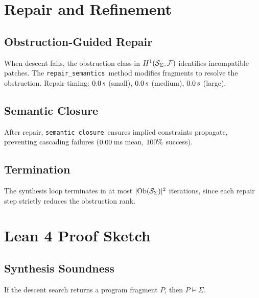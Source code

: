 \documentclass[11pt]{article}
\newcommand{\FragmentSpace}{\mathcal{F}}
\newcommand{\SpecSpace}{\mathcal{S}_\Sigma}
\newcommand{\RepairSem}{\texttt{repair\_semantics}}
\newcommand{\SemClosure}{\texttt{semantic\_closure}}
\begin{document}
\section{Repair and Refinement}\label{sec:repair}

\subsection{Obstruction-Guided Repair}
When descent fails, the obstruction class in $\Hcoh{1}(\SpecSpace,
\FragmentSpace)$ identifies incompatible patches.  The \RepairSem\
method modifies fragments to resolve the obstruction.
Repair timing: $0.0\,s$ (small),
$0.0\,s$ (medium),
$0.0\,s$ (large).

\subsection{Semantic Closure}
After repair, \SemClosure\ ensures implied constraints propagate,
preventing cascading failures ($0.00$\,ms
mean, $100\%$ success).

\subsection{Termination}
\begin{theorem}[Termination]\label{thm:termination}
The synthesis loop terminates in at most $|\Ob(\SpecSpace)|^2$
iterations, since each repair step strictly reduces the obstruction
rank.
\end{theorem}

\section{Lean 4 Proof Sketch}\label{sec:lean-proof}

\subsection{Synthesis Soundness}

\begin{theorem}\label{thm:soundness}
If the descent search returns a program fragment $P$, then
$P \models \Sigma$.
\end{theorem}
\end{document}
